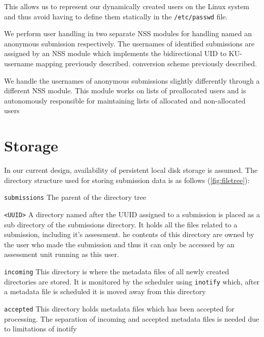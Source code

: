 This allows us to represent our dynamically created users on the Linux
system and thus avoid having to define them statically in the
\texttt{/etc/passwd} file.

We perform user handling in two separate NSS modules for handling
named an anonymous submission respectively. The usernames of
identified submissions are assigned by an NSS module which implements
the bidirectional UID to KU-username mapping previously described.
conversion scheme previously described.

We handle the usernames of anonymous submissions slightly
differently through a different NSS module. This module works on lists
of preallocated users and is autonomously responsible for maintaining
lists of allocated and non-allocated users 

\section{Storage}
In our current design, availability of persistent local disk storage
is assumed. The directory structure used for storing submission data
is as follows (\cref{fig:filetree}):

\begin{description}
\item{\texttt{submissions}} The parent of the directory tree
\item{\texttt{<UUID>}} A directory named after the UUID assigned to
  a submission is placed as a sub directory of the submissions
  directory. It holds all the files related to a submission, including
  it's assessment.  he contents of this directory are owned by the user
  who made the submission and thus it can only be accessed by an
  assessment unit running as this user.
\item{\texttt{incoming}} This directory is where the metadata files of
  all newly created directories are stored. It is monitored by the
  scheduler using \texttt{inotify} which, after a metadata file is
  scheduled it is moved away from this directory
\item{\texttt{accepted}} This directory holds metadata files which has
  been accepted for processing. The separation of incoming and
  accepted metadata files is needed due to limitations of inotify 
\end{description}


